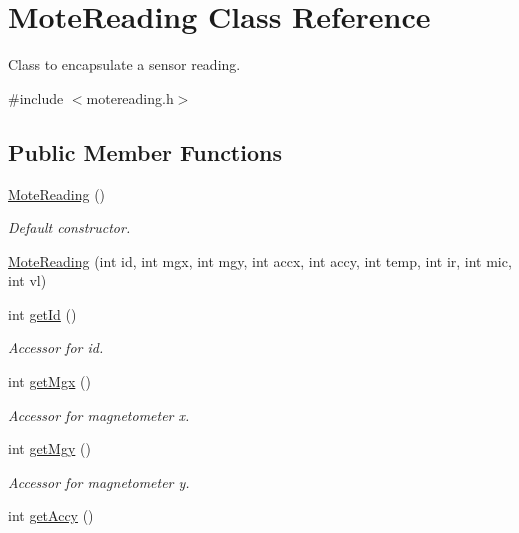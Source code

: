 \hypertarget{classMoteReading}{
\section{MoteReading Class Reference}
\label{classMoteReading}
}


Class to encapsulate a sensor reading.  




{\ttfamily \#include $<$motereading.h$>$}

\subsection*{Public Member Functions}
\begin{DoxyCompactItemize}
\item 
\hyperlink{classMoteReading_ad2555254ab4fd4ce31ebafeea362d255}{MoteReading} ()
\begin{DoxyCompactList}\small\item\em Default constructor. \item\end{DoxyCompactList}\item 
\hyperlink{classMoteReading_aea4d9a40d3999ed29eb6044146a5dabc}{MoteReading} (int id, int mgx, int mgy, int accx, int accy, int temp, int ir, int mic, int vl)
\item 
int \hyperlink{classMoteReading_a123a08348d6a1ba80a4055cb5f5afaa6}{getId} ()
\begin{DoxyCompactList}\small\item\em Accessor for id. \item\end{DoxyCompactList}\item 
int \hyperlink{classMoteReading_a318b7e6afba062ee3df207495070e277}{getMgx} ()
\begin{DoxyCompactList}\small\item\em Accessor for magnetometer x. \item\end{DoxyCompactList}\item 
int \hyperlink{classMoteReading_a4344f67449dbd79febac0c4795b185f4}{getMgy} ()
\begin{DoxyCompactList}\small\item\em Accessor for magnetometer y. \item\end{DoxyCompactList}\item 
int \hyperlink{classMoteReading_af918c7ca6c9fea98a3d608b61dbaffae}{getAccy} ()

\end{DoxyCompactItemize}

